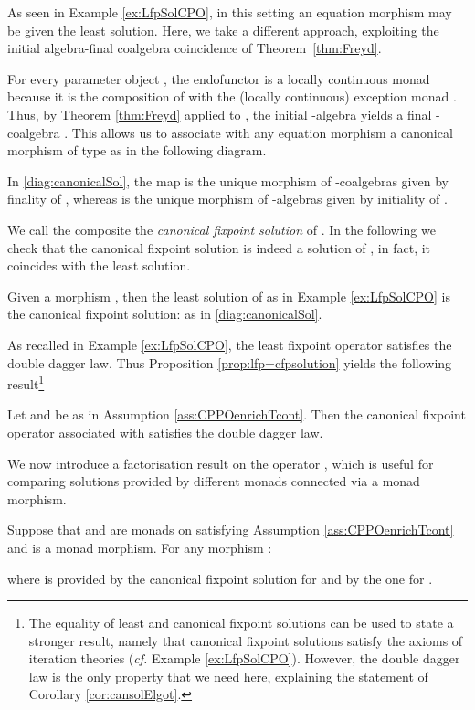 \documentclass[oribibl,envcountsame,envcountsect,runningheads]{llncs}
\renewcommand{\>}{\rangle}
\begin{document}
As seen in Example \ref{ex:LfpSolCPO}, in this setting an equation morphism  may be given the least solution. Here, we take  a different approach, exploiting the initial algebra-final coalgebra coincidence of Theorem~\ref{thm:Freyd}.



For every parameter object , the endofunctor  is
a locally continuous monad because it is the composition of  with the (locally continuous) exception monad . Thus, by Theorem \ref{thm:Freyd} applied to , the initial -algebra  yields a final -coalgebra . This allows us to associate with any equation morphism  a canonical morphism of type  as in the following diagram.

In \eqref{diag:canonicalSol}, the map  is the unique morphism of  -coalgebras given by finality of  , whereas  is the unique morphism of -algebras given by initiality of .

We call the composite  the \emph{canonical fixpoint solution} of . In the following we check that the canonical fixpoint solution is indeed a solution of , in fact, it coincides with the least solution. 


\newcommand{\proplfpcfpsolution}{Given a morphism , then the least solution of  as in Example \ref{ex:LfpSolCPO} is the canonical fixpoint solution:  as in \eqref{diag:canonicalSol}.}
\begin{proposition} \label{prop:lfp=cfpsolution}
\proplfpcfpsolution
\end{proposition}


As recalled in Example \ref{ex:LfpSolCPO}, the least fixpoint operator  satisfies the double dagger law. Thus Proposition \ref{prop:lfp=cfpsolution} yields the following result\footnote{The equality of least and canonical fixpoint solutions can be used to state a stronger result, namely that canonical fixpoint solutions satisfy the axioms of iteration theories (\emph{cf.} Example \ref{ex:LfpSolCPO}). However, the double dagger law is the only property that we need here, explaining the statement of Corollary \ref{cor:cansolElgot}.}

\begin{corollary}\label{cor:cansolElgot} Let  and  be as in Assumption \ref{ass:CPPOenrichTcont}. Then the canonical fixpoint operator  associated with  satisfies the double dagger law.
\end{corollary}

We now introduce a factorisation result on the operator , which is useful for comparing solutions provided by different monads connected via a monad morphism.
\newcommand{\propfact}{Suppose that  and  are monads on  satisfying Assumption \ref{ass:CPPOenrichTcont} and  is a monad morphism. For any morphism :

where  is provided by the canonical fixpoint solution for  and  by the one for .}
\begin{proposition} \label{prop:factorizationLemma}
\propfact
\end{proposition}
\end{document}
